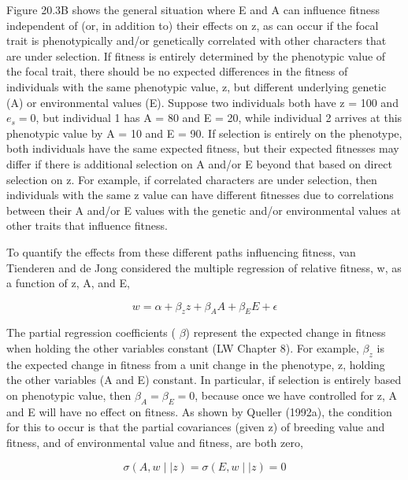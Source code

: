 \documentclass{article}
\begin{document}
Figure 20.3B shows the general situation where E and A can influence fitness independent of (or, in addition to) their effects on z, as can occur if the focal trait is phenotypically and/or genetically correlated with other characters that are under selection. If fitness is entirely determined by the phenotypic value of the focal trait, there should be no expected differences in the fitness of individuals with the same phenotypic value, z, but different underlying genetic (A) or environmental values (E). Suppose two individuals both have z = 100 and  $ e_s = 0 $, but individual 1 has A = 80 and E = 20, while individual 2 arrives at this phenotypic value by A = 10 and E = 90. If selection is entirely on the phenotype, both individuals have the same expected fitness, but their expected fitnesses may differ if there is additional selection on A and/or E beyond that based on direct selection on z. For example, if correlated characters are under selection, then individuals with the same z value can have different fitnesses due to correlations between their A and/or E values with the genetic and/or environmental values at other traits that influence fitness.

To quantify the effects from these different paths influencing fitness, van Tienderen and de Jong considered the multiple regression of relative fitness, w, as a function of z, A, and E,

\begin{equation}
w=\alpha+\beta_{z}z+\beta_{A}A+\beta_{E}E+\epsilon
\tag{20.7a}
\label{eq:20_7a}
\end{equation}

The partial regression coefficients ( $ \beta $) represent the expected change in fitness when holding the other variables constant (LW Chapter 8). For example,  $ \beta_z $ is the expected change in fitness from a unit change in the phenotype, z, holding the other variables (A and E) constant. In particular, if selection is entirely based on phenotypic value, then  $ \beta_A = \beta_E = 0 $, because once we have controlled for z, A and E will have no effect on fitness. As shown by Queller (1992a), the condition for this to occur is that the partial covariances (given z) of breeding value and fitness, and of environmental value and fitness, are both zero,

\begin{equation}
\sigma(A,w\mid\mid z)=\sigma(E,w\mid\mid z)=0
\tag{20.7b}
\label{eq:20_7b}
\end{equation}
\end{document}
